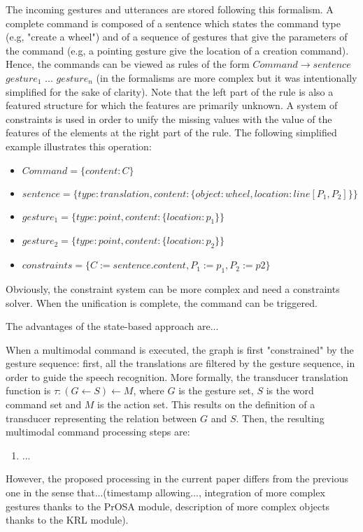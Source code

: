 \documentclass[a4paper]{article}
\begin{document}
The incoming gestures and utterances are stored following this formalism. A complete command is composed of a sentence which states the command type (e.g, "create a wheel") and of a sequence of gestures that give the parameters of the command (e.g, a pointing gesture give the location of a creation command). Hence, the commands can be viewed as rules of the form $Command \rightarrow sentence$ $gesture_1$ $...$ $gesture_n$ (in \cite{unification-based} the formalisms are more complex but it was intentionally simplified for the sake of clarity). Note that the left part of the rule is also a featured structure for which the features are primarily unknown. A system of constraints is used in order to unify the missing values with the value of the features of the elements at the right part of the rule. The following simplified example illustrates this operation:

\begin{itemize}
	\item $Command = \lbrace content: C \rbrace$ 
	\item $sentence = \lbrace type: translation, content: \lbrace object: wheel, location: line[P_1, P_2] \rbrace\rbrace$
	\item $gesture_1 = \lbrace type: point, content: \lbrace location: p_1 \rbrace\rbrace$
	\item $gesture_2 = \lbrace type: point, content: \lbrace location: p_2 \rbrace\rbrace$
	\item $constraints = \lbrace C := sentence.content, P_1 := p_1, P_2 := p2 \rbrace$
\end{itemize}

Obviously, the constraint system can be more complex and need a constraints solver. When the unification is complete, the command can be triggered.

The advantages of the state-based approach are...

When a multimodal command is executed, the graph is first "constrained" by the gesture sequence: first, all the translations are filtered by the gesture sequence, in order to guide the speech recognition. More formally, the transducer translation function is $\tau:(G \leftarrow S) \leftarrow M$, where $G$ is the gesture set, $S$ is the word command set and $M$ is the action set. This results on the definition of a transducer representing the relation between $G$ and $S$. Then, the resulting multimodal command processing steps are:
\begin{enumerate}
	\item ...
\end{enumerate}
However, the proposed processing in the current paper differs from the previous one in the sense that...(timestamp allowing..., integration of more complex gestures thanks to the PrOSA module, description of more complex objects thanks to the KRL module).
\end{document}
